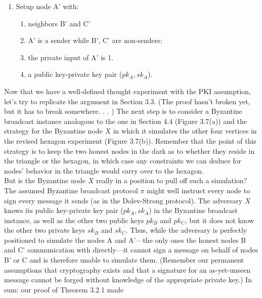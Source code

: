 {\begin{enumerate}
\begin{enumerate}[label=(\roman*)]
        \item neighbors A' and C;
        \item A' is a sender while B', C are non-senders.
        \item a public key-private key pair ($pk_B, sk_B$).
    \end{enumerate}
    \item Setup node A' with:
    \begin{enumerate}[label=(\roman*)]
        \item neighbors B' and C'
        \item A' is a sender while B', C' are non-senders;
        \item the private input of A' is 1.
        \item a public key-private key pair ($pk_A, sk_A$).
    \end{enumerate}
\end{enumerate}}
\newpage
Now that we have a well-defined thought experiment with the PKI assumption, let’s try
to replicate the argument in Section 3.3. (The proof hasn't broken yet, but it has to break
somewhere. . . ) The next step is to consider a Byzantine broadcast instance analogous to
the one in Section 4.4 (Figure 3.7(a)) and the strategy for the Byzantine node $X$ in which it
simulates the other four vertices in the revised hexagon experiment (Figure 3.7(b)). Remember
that the point of this strategy is to keep the two honest nodes in the dark as to whether
they reside in the triangle or the hexagon, in which case any constraints we can deduce for
nodes’ behavior in the triangle would carry over to the hexagon.\\
But is the Byzantine node $X$ really in a position to pull off such a simulation? The
assumed Byzantine broadcast protocol $\pi$ might well instruct every node to sign every message
it sends (as in the Dolev-Strong protocol). The adversary $X$ knows its public key-private key
pair ($pk_A, sk_A$) in the Byzantine broadcast instance, as well as the other two public keys $pk_B$
and $pk_C$, but it does not know the other two private keys $sk_B$ and $sk_C$. Thus, while the
adversary is perfectly positioned to simulate the nodes A and A'—the only ones the honest nodes B and C' communication with directly—it cannot sign a message on behalf of nodes B' or C and is therefore unable to simulate them. (Remember our permanent assumptions that
cryptography exists and that a signature for an as-yet-unseen message cannot be forged
without knowledge of the appropriate private key.) In sum: our proof of Theorem 3.2.1 made
